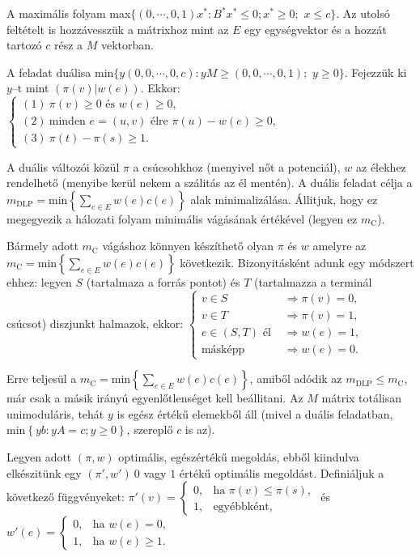 A maximális folyam max$\{ (0, \cdots,0,1)x^* : B^*x^* \leq 0; x^* \geq 0;$ $x
\leq c \}$. Az utolsó feltételt is hozzávesszük a mátrixhoz mint az $E$ egy
egységvektor és a hozzát tartozó $c$ rész a $M$ vektorban.

A feladat duálisa min$\{ y(0, 0, \cdots, 0, c) :yM \geq (0, 0, \cdots, 0, 1);$
$y \geq 0 \}$. Fejezzük ki $y$--t mint $\left( \pi\left(v\right) |
w\left(e\right)\right)$.
Ekkor: $\begin{cases} 
(1)~\pi(v) \geq 0 \mbox{ és } w(e) \geq 0, \\
(2)~\mbox{minden } e = (u,v) \mbox{ élre }  \pi(u)-w(e) \geq 0, \\
(3)~\pi(t)-\pi(s) \geq 1. \end{cases}$ 

A duális változói közül $\pi$ a csúcsohkhoz (menyivel nőt a potenciál), $w$ az
élekhez rendelhető (menyibe kerül nekem a szálitás az él mentén). A duális
feladat célja a $m_{\text{DLP}}= \mbox{min} \left\{ \sum_{e\in E}^{}
w(e)c(e)\right\}$ alak minimalizálása. Állitjuk, hogy ez megegyezik a hálozati
folyam minimális vágásának értékével (legyen ez $m_{\text{C}}$).

Bármely adott $m_{\mbox{C}}$ vágáshoz könnyen készíthető olyan $\pi$ és $w$
amelyre az $m_{\text{C}}= \mbox{min} \left\{ \sum_{e\in E}^{} w(e)c(e)\right\}$
következik. Bizonyitásként adunk egy módszert ehhez: legyen $S$ (tartalmaza a
forrás pontot) és $T$ (tartalmazza a terminál csúcsot) diszjunkt halmazok, ekkor:
$\begin{cases}
v \in S &\Rightarrow \pi(v)=0, \\
v \in T &\Rightarrow \pi(v)=1, \\
e \in (S,T) \mbox{ él } &\Rightarrow w(e)=1, \\
\mbox{másképp} &\Rightarrow w(e)=0.
\end{cases}$

Erre teljesül a $m_{\text{C}}= \mbox{min} \left\{ \sum_{e\in E}^{}
w(e)c(e)\right\}$, amiből adódik az $m_{\mbox{DLP}} \leq m_{\mbox{C}}$, már csak
a másik irányú egyenlőtlenséget kell beállitani. Az $M$ mátrix totálisan
unimoduláris, tehát $y$ is egész értékű elemekből áll (mivel a duális
feladatban, min$\left\{ yb:yA=c; y\geq 0 \right\}$, szereplő $c$ is az).

Legyen adott $(\pi,w)$ optimális, egészértékű megoldás, ebből kiindulva
elkészitünk egy $(\pi',w')~0$ vagy $1$ értékű optimális megoldást. Definiáljuk a
következő függvényeket:
$\pi'(v)=
\begin{cases}
0, &\mbox{ha } \pi(v) \leq \pi(s), \\
1, &\mbox{egyébbként}, 
\end{cases}$ és
$w'(e)=
\begin{cases}
0, &\mbox{ha } w(e)=0, \\
1, &\mbox{ha } w(e) \geq 1.
\end{cases}$ 

